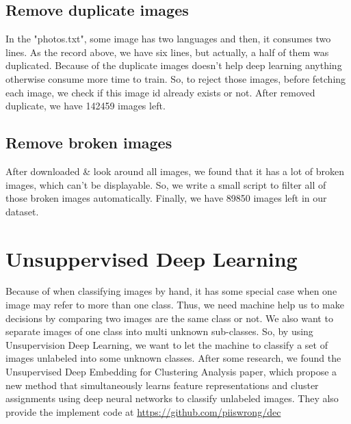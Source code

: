 \documentclass[11pt]{article}
\begin{document}
\subsection{Remove duplicate images}
In the "photos.txt", some image has two languages and then, it consumes two lines. As the record above, we have six lines, but actually, a half of them was duplicated. \newline
Because of the duplicate images doesn't help deep learning anything otherwise consume more time to train. So, to reject those images, before fetching each image, we check if this image id already exists or not. \newline
After removed duplicate, we have 142459 images left.
\subsection{Remove broken images}
After downloaded \& look around all images, we found that it has a lot of broken images, which can't be displayable. So, we write a small script to filter all of those broken images automatically. \newline
Finally, we have 89850 images left in our dataset.












\section{Unsuppervised Deep Learning}
Because of when classifying images by hand, it has some special case when one image may refer to more than one class. Thus, we need machine help us to make decisions by comparing two images are the same class or not. We also want to separate images of one class into multi unknown sub-classes. So, by using Unsupervision Deep Learning, we want to let the machine to classify a set of images unlabeled into some unknown classes. \newline
After some research, we found the Unsupervised Deep Embedding for Clustering Analysis\cite{dec} paper, which propose a new method that simultaneously learns feature representations and cluster assignments using deep neural networks to classify unlabeled images. They also provide the implement code at \href{https://github.com/piiswrong/dec}{https://github.com/piiswrong/dec}
\end{document}
